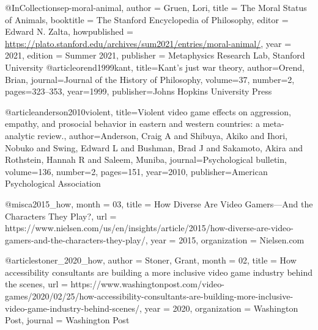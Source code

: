 @InCollection{sep-moral-animal,
	author       =	{Gruen, Lori},
	title        =	{{The Moral Status of Animals}},
	booktitle    =	{The {Stanford} Encyclopedia of Philosophy},
	editor       =	{Edward N. Zalta},
	howpublished =	{\url{https://plato.stanford.edu/archives/sum2021/entries/moral-animal/}},
	year         =	{2021},
	edition      =	{{S}ummer 2021},
	publisher    =	{Metaphysics Research Lab, Stanford University}
}
@article{orend1999kant,
  title={Kant's just war theory},
  author={Orend, Brian},
  journal={Journal of the History of Philosophy},
  volume={37},
  number={2},
  pages={323--353},
  year={1999},
  publisher={Johns Hopkins University Press}
}

@article{anderson2010violent,
  title={Violent video game effects on aggression, empathy, and prosocial behavior in eastern and western countries: a meta-analytic review.},
  author={Anderson, Craig A and Shibuya, Akiko and Ihori, Nobuko and Swing, Edward L and Bushman, Brad J and Sakamoto, Akira and Rothstein, Hannah R and Saleem, Muniba},
  journal={Psychological bulletin},
  volume={136},
  number={2},
  pages={151},
  year={2010},
  publisher={American Psychological Association}
}

@misc{a2015_how,
  month = {03},
  title = {How Diverse Are Video Gamers—And the Characters They Play?},
  url = {https://www.nielsen.com/us/en/insights/article/2015/how-diverse-are-video-gamers-and-the-characters-they-play/},
  year = {2015},
  organization = {Nielsen.com}
}

@article{stoner_2020_how,
  author = {Stoner, Grant},
  month = {02},
  title = {How accessibility consultants are building a more inclusive video game industry behind the scenes},
  url = {https://www.washingtonpost.com/video-games/2020/02/25/how-accessibility-consultants-are-building-more-inclusive-video-game-industry-behind-scenes/},
  year = {2020},
  organization = {Washington Post},
  journal = {Washington Post}
}
